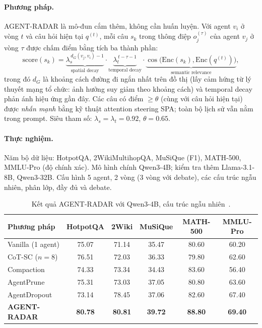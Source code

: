 \paragraph{Phương pháp.} AGENT-RADAR là mô-đun cắm thêm, không cần huấn luyện. Với agent $v_i$ ở vòng $t$ và câu hỏi hiện tại $q^{(t)}$, mỗi câu $s_k$ trong thông điệp $o_j^{(\tau)}$ của agent $v_j$ ở vòng $\tau$ được chấm điểm bằng tích ba thành phần:
\begin{equation}
  \text{score}(s_k) = \underbrace{\lambda_s^{\,d_G(v_j,v_i)-1}}_{\text{spatial decay}} \cdot \underbrace{\lambda_t^{\,t-\tau-1}}_{\text{temporal decay}} \cdot \underbrace{\cos\big(\mathrm{Enc}(s_k), \mathrm{Enc}(q^{(t)})\big)}_{\text{semantic relevance}},
\end{equation}
trong đó $d_G$ là khoảng cách đường đi ngắn nhất trên đồ thị (lấy cảm hứng từ lý thuyết mạng tổ chức: ảnh hưởng suy giảm theo khoảng cách) và temporal decay phản ánh hiệu ứng gần đây. Các câu có điểm $\ge \theta$ (cùng với câu hỏi hiện tại) được \emph{nhấn mạnh} bằng kỹ thuật attention steering SPA; toàn bộ lịch sử vẫn nằm trong prompt. Siêu tham số: $\lambda_s = \lambda_t = 0.92$, $\theta = 0.65$.

\paragraph{Thực nghiệm.} Năm bộ dữ liệu: HotpotQA, 2WikiMultihopQA, MuSiQue (F1), MATH-500, MMLU-Pro (độ chính xác). Mô hình chính Qwen3-4B; kiểm tra thêm Llama-3.1-8B, Qwen3-32B. Cấu hình 5 agent, 2 vòng (3 vòng với debate), các cấu trúc ngẫu nhiên, phân lớp, đầy đủ và debate.

\begin{table}[!htbp]
\centering
\small
\caption{Kết quả AGENT-RADAR với Qwen3-4B, cấu trúc ngẫu nhiên~\cite{p8radar}.}
\label{tab:radar}
\begin{tabular}{lccccc}
\toprule
\textbf{Phương pháp} & \textbf{HotpotQA} & \textbf{2Wiki} & \textbf{MuSiQue} & \textbf{MATH-500} & \textbf{MMLU-Pro} \\
\midrule
Vanilla (1 agent) & 75.07 & 71.14 & 35.47 & 80.60 & 60.20 \\
CoT-SC ($n=8$)     & 76.51 & 72.03 & 36.33 & 79.80 & 62.60 \\
Compaction         & 74.33 & 73.34 & 34.43 & 83.60 & 56.40 \\
AgentPrune         & 75.31 & 73.03 & 37.05 & 80.80 & 63.60 \\
AgentDropout       & 73.14 & 78.45 & 37.06 & 82.60 & 67.40 \\
\textbf{AGENT-RADAR} & \textbf{80.78} & \textbf{80.81} & \textbf{39.72} & \textbf{88.80} & \textbf{69.40} \\
\bottomrule
\end{tabular}
\end{table}

